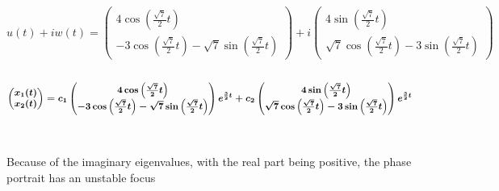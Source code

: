 \documentclass[12pt]{article}
\begin{document}
$$
u(t) + iw(t) = 
\begin{pmatrix}
	4\cos\left( \frac{\sqrt{7}}{2}t \right) \\
	-3\cos\left( \frac{\sqrt{7}}{2}t \right) - \sqrt{7}\sin\left( \frac{\sqrt{7}}{2}t \right)
\end{pmatrix} + 
i \begin{pmatrix}
	4\sin\left( \frac{\sqrt{7}}{2}t \right) \\
	\sqrt{7}\cos\left( \frac{\sqrt{7}}{2}t \right) - 3\sin\left( \frac{\sqrt{7}}{2}t \right)
\end{pmatrix}
$$ \\
$$ \boldmath
\begin{pmatrix}
	x_1(t) \\
	x_2(t)
\end{pmatrix} = 
c_1 
\begin{pmatrix}
	4\cos\left( \frac{\sqrt{7}}{2}t \right) \\
	-3\cos\left( \frac{\sqrt{7}}{2}t \right) - \sqrt{7}\sin\left( \frac{\sqrt{7}}{2}t \right)
\end{pmatrix} e^{\frac{3}{2}t} + 
c_2 
\begin{pmatrix}
	4\sin\left( \frac{\sqrt{7}}{2}t \right) \\
	\sqrt{7}\cos\left( \frac{\sqrt{7}}{2}t \right) - 3\sin\left( \frac{\sqrt{7}}{2}t \right)
\end{pmatrix} e^{\frac{3}{2}t}
$$
\\ \\
Because of the imaginary eigenvalues, with the real part being positive, the phase portrait has an unstable focus

\newpage
\end{document}
